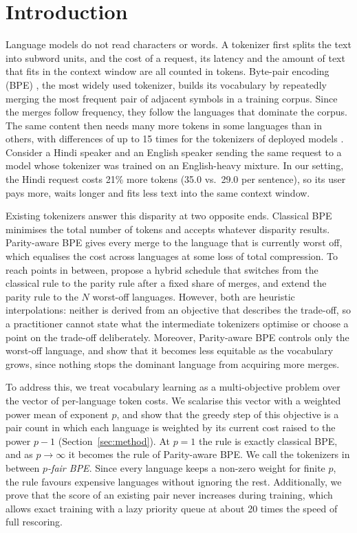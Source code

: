 \section{Introduction}
\label{sec:intro}

Language models do not read characters or words. A tokenizer first splits the text into
subword units, and the cost of a request, its latency and the amount of text that fits in
the context window are all counted in tokens. Byte-pair encoding (BPE)
\citep{gage1994,sennrich2016}, the most widely used tokenizer, builds its vocabulary by
repeatedly merging the most frequent pair of adjacent symbols in a training corpus. Since
the merges follow frequency, they follow the languages that dominate the corpus. The same
content then needs many more tokens in some languages than in others, with differences of
up to 15 times for the tokenizers of deployed models \citep{petrov2023}. Consider a Hindi
speaker and an English speaker sending the same request to a model whose tokenizer was
trained on an English-heavy mixture. In our setting, the Hindi request costs 21\% more
tokens (35.0 vs.\ 29.0 per sentence), so its user pays more, waits longer and fits less
text into the same context window.

Existing tokenizers answer this disparity at two opposite ends. Classical BPE minimises the
total number of tokens and accepts whatever disparity results. Parity-aware BPE
\citep{foroutan2026} gives every merge to the language that is currently worst off, which
equalises the cost across languages at some loss of total compression. To reach points in
between, \citet{foroutan2026} propose a hybrid schedule that switches from the classical
rule to the parity rule after a fixed share of merges, and \citet{kanjirangat2026} extend
the parity rule to the $N$ worst-off languages. However, both are heuristic interpolations:
neither is derived from an objective that describes the trade-off, so a practitioner cannot
state what the intermediate tokenizers optimise or choose a point on the trade-off
deliberately. Moreover, Parity-aware BPE controls only the worst-off language, and
\citet{lee2026} show that it becomes less equitable as the vocabulary grows, since nothing
stops the dominant language from acquiring more merges.

To address this, we treat vocabulary learning as a multi-objective problem over the vector
of per-language token costs. We scalarise this vector with a weighted power mean of
exponent $p$, and show that the greedy step of this objective is a pair count in which each
language is weighted by its current cost raised to the power $p-1$
(Section~\ref{sec:method}). At $p=1$ the rule is exactly classical BPE, and as
$p\to\infty$ it becomes the rule of Parity-aware BPE. We call the tokenizers in between
\emph{$p$-fair BPE}. Since every language keeps a non-zero weight for finite $p$, the rule
favours expensive languages without ignoring the rest. Additionally, we prove that the
score of an existing pair never increases during training, which allows exact training with
a lazy priority queue \citep{minoux1978} at about 20 times the speed of full rescoring.

